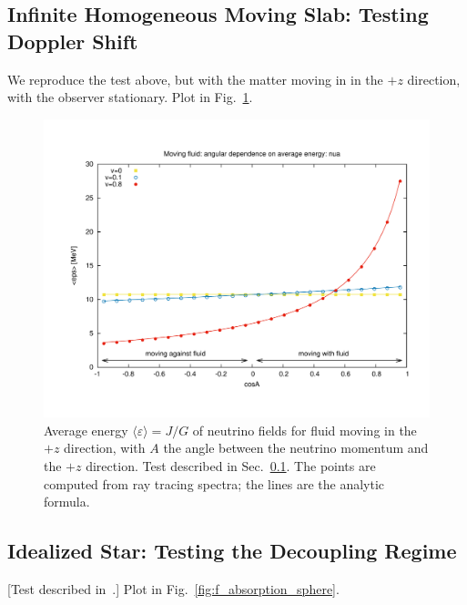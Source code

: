 \documentclass[aps,floatfix,prd,superscriptaddress,twocolumn]{revtex4-1}
\newcommand{\todo}[1]{\marginpar{\tiny{\textcolor{red}{#1}}}}
\begin{document}
\subsection{Infinite Homogeneous Moving Slab:
  Testing Doppler Shift}
\label{ssec:test_doppler}
We reproduce the test above, but with the matter moving in
in the $+z$ direction, with the observer stationary.
Plot in Fig.~\ref{fig:avg_eps_doppler}.
\todo{redo test at same thermo point}
\todo{describe test}

\begin{figure}
  \includegraphics[width=\columnwidth]{fig-moving_fluid_avg_eps}
  \caption{Average energy $\langle\varepsilon\rangle=J/G$
    of neutrino fields for fluid moving in the $+z$ direction,
    with $A$ the angle between the neutrino momentum and the $+z$ direction.
    Test described in Sec.~\ref{ssec:test_doppler}.
    The points are computed from ray tracing spectra; the lines are the
    analytic formula.
  }
  \label{fig:avg_eps_doppler}
\end{figure}

\subsection{Idealized Star:
  Testing the Decoupling Regime}
\label{ssec:test_ab_star}
[Test described in~\cite[Sec.~3.2]{smit1997-two_moment}.]
Plot in Fig.~\ref{fig:f_absorption_sphere}.
\end{document}
